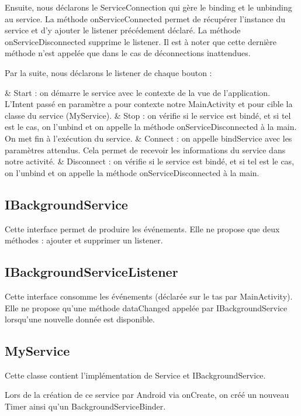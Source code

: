 \documentclass{report}
\begin{document}
			Ensuite, nous déclarons le ServiceConnection qui gère le binding et le unbinding au service.
			La méthode onServiceConnected permet de récupérer l'instance du service et d'y ajouter le listener précédement déclaré.
			La méthode onServiceDisconnected supprime le listener.
			Il est à noter que cette dernière méthode n'est appelée que dans le cas de déconnections inattendues.
	
			Par la suite, nous déclarons le listener de chaque bouton :
			\begin{easylist}[itemize]
				& Start : on démarre le service avec le contexte de la vue de l'application.
				L'Intent passé en paramètre a pour contexte notre MainActivity et pour cible la classe du service (MyService).
				& Stop : on vérifie si le service est bindé, et si tel est le cas, on l'unbind et on appelle la méthode onServiceDisconnected à la main. 
				On met fin à l'exécution du service.
				& Connect : on appelle bindService avec les paramètres attendus.
				Cela permet de recevoir les informations du service dans notre activité.
				& Disconnect : on vérifie si le service est bindé, et si tel est le cas, on l'unbind et on appelle la méthode onServiceDisconnected à la main. 
			\end{easylist}

		\subsection{IBackgroundService}
			Cette interface permet de produire les événements. Elle ne propose que deux méthodes : ajouter et supprimer un listener.

		\subsection{IBackgroundServiceListener}
			Cette interface consomme les événements (déclarée sur le tas par MainActivity).
			Elle ne propose qu'une méthode dataChanged appelée par IBackgroundService lorsqu'une nouvelle donnée est disponible.
		
		\subsection{MyService}
			Cette classe contient l'implémentation de Service et IBackgroundService.

			Lors de la création de ce service par Android via onCreate, on créé un nouveau Timer ainsi qu'un BackgroundServiceBinder. 
\end{document}
